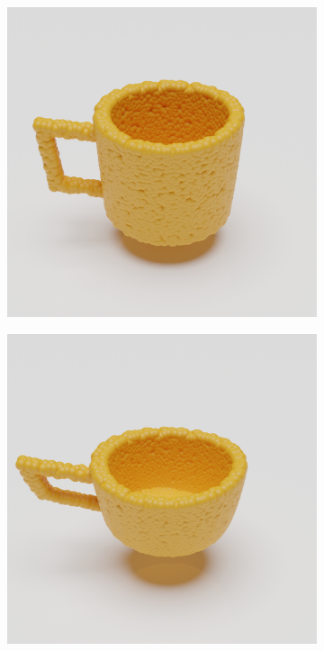 \documentclass{article}
\begin{document}
\begin{figure}
\begin{subfigure}[b]{0.19\textwidth}
    \end{subfigure}
    \begin{subfigure}[b]{0.19\textwidth}
        \includegraphics[width=\textwidth]{figures/blender/warp3/14.png}
    \end{subfigure}
    \begin{subfigure}[b]{0.19\textwidth}
        \includegraphics[width=\textwidth]{figures/blender/warp3/15.png}

\end{subfigure}
\end{figure}
\end{document}
